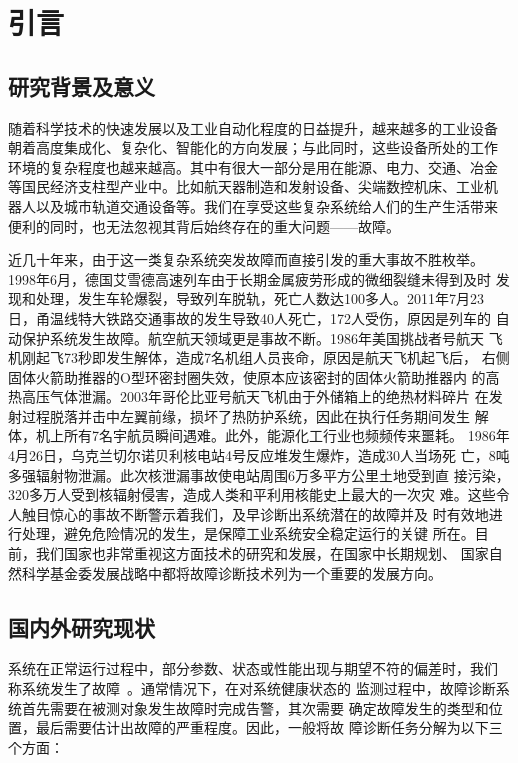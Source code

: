 \chapter{引言}
\label{cha:intro}

\section{研究背景及意义}

随着科学技术的快速发展以及工业自动化程度的日益提升，越来越多的工业设备
朝着高度集成化、复杂化、智能化的方向发展；与此同时，这些设备所处的工作
环境的复杂程度也越来越高。其中有很大一部分是用在能源、电力、交通、冶金
等国民经济支柱型产业中。比如航天器制造和发射设备、尖端数控机床、工业机
器人以及城市轨道交通设备等。我们在享受这些复杂系统给人们的生产生活带来
便利的同时，也无法忽视其背后始终存在的重大问题——故障。

近几十年来，由于这一类复杂系统突发故障而直接引发的重大事故不胜枚举。
1998年6月，德国艾雪德高速列车由于长期金属疲劳形成的微细裂缝未得到及时
发现和处理，发生车轮爆裂，导致列车脱轨，死亡人数达100多人。2011年7月23
日，甬温线特大铁路交通事故的发生导致40人死亡，172人受伤，原因是列车的
自动保护系统发生故障。航空航天领域更是事故不断。1986年美国挑战者号航天
飞机刚起飞73秒即发生解体，造成7名机组人员丧命，原因是航天飞机起飞后，
右侧固体火箭助推器的O型环密封圈失效，使原本应该密封的固体火箭助推器内
的高热高压气体泄漏。2003年哥伦比亚号航天飞机由于外储箱上的绝热材料碎片
在发射过程脱落并击中左翼前缘，损坏了热防护系统，因此在执行任务期间发生
解体，机上所有7名宇航员瞬间遇难。此外，能源化工行业也频频传来噩耗。
1986年4月26日，乌克兰切尔诺贝利核电站4号反应堆发生爆炸，造成30人当场死
亡，8吨多强辐射物泄漏。此次核泄漏事故使电站周围6万多平方公里土地受到直
接污染，320多万人受到核辐射侵害，造成人类和平利用核能史上最大的一次灾
难。这些令人触目惊心的事故不断警示着我们，及早诊断出系统潜在的故障并及
时有效地进行处理，避免危险情况的发生，是保障工业系统安全稳定运行的关键
所在。目前，我们国家也非常重视这方面技术的研究和发展，在国家中长期规划、
国家自然科学基金委发展战略中都将故障诊断技术列为一个重要的发展方向。

\section{国内外研究现状}

系统在正常运行过程中，部分参数、状态或性能出现与期望不符的偏差时，我们
称系统发生了故障~\cite{van1997remarks}。通常情况下，在对系统健康状态的
监测过程中，故障诊断系统首先需要在被测对象发生故障时完成告警，其次需要
确定故障发生的类型和位置，最后需要估计出故障的严重程度。因此，一般将故
障诊断任务分解为以下三个方面：

